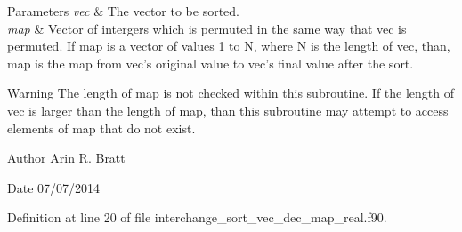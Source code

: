\begin{DoxyParams}{Parameters}
{\em vec} & The vector to be sorted.\\
\hline
{\em map} & Vector of intergers which is permuted in the same way that vec is permuted. If map is a vector of values 1 to N, where N is the length of vec, than, map is the map from vec's original value to vec's final value after the sort.\\
\hline
\end{DoxyParams}
\begin{DoxyWarning}{Warning}
The length of map is not checked within this subroutine. If the length of vec is larger than the length of map, than this subroutine may attempt to access elements of map that do not exist.
\end{DoxyWarning}
\begin{DoxyAuthor}{Author}
Arin R. Bratt 
\end{DoxyAuthor}
\begin{DoxyDate}{Date}
07/07/2014 
\end{DoxyDate}


Definition at line 20 of file interchange\-\_\-sort\-\_\-vec\-\_\-dec\-\_\-map\-\_\-real.\-f90.

